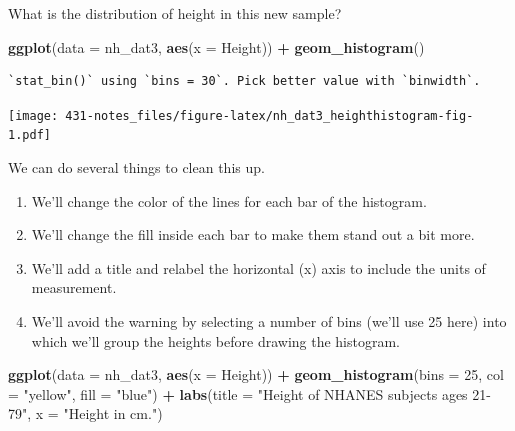 \documentclass[
]{book}
\newenvironment{Shaded}{\begin{snugshade}}{\end{snugshade}}
\newcommand{\DataTypeTok}[1]{\textcolor[rgb]{0.13,0.29,0.53}{#1}}
\newcommand{\DecValTok}[1]{\textcolor[rgb]{0.00,0.00,0.81}{#1}}
\newcommand{\KeywordTok}[1]{\textcolor[rgb]{0.13,0.29,0.53}{\textbf{#1}}}
\newcommand{\NormalTok}[1]{#1}
\newcommand{\OperatorTok}[1]{\textcolor[rgb]{0.81,0.36,0.00}{\textbf{#1}}}
\newcommand{\StringTok}[1]{\textcolor[rgb]{0.31,0.60,0.02}{#1}}
\providecommand{\tightlist}{%
  \setlength{\itemsep}{0pt}\setlength{\parskip}{0pt}}
\begin{document}
What is the distribution of height in this new sample?

\begin{Shaded}
\begin{Highlighting}[]
\KeywordTok{ggplot}\NormalTok{(}\DataTypeTok{data =}\NormalTok{ nh_dat3, }\KeywordTok{aes}\NormalTok{(}\DataTypeTok{x =}\NormalTok{ Height)) }\OperatorTok{+}\StringTok{ }
\StringTok{    }\KeywordTok{geom_histogram}\NormalTok{() }
\end{Highlighting}
\end{Shaded}

\begin{verbatim}
`stat_bin()` using `bins = 30`. Pick better value with `binwidth`.
\end{verbatim}

\texttt{[image: 431-notes\_files/figure-latex/nh\_dat3\_heighthistogram-fig-1.pdf]}

We can do several things to clean this up.

\begin{enumerate}
\def\labelenumi{\arabic{enumi}.}
\tightlist
\item
  We'll change the color of the lines for each bar of the histogram.
\item
  We'll change the fill inside each bar to make them stand out a bit more.
\item
  We'll add a title and relabel the horizontal (x) axis to include the units of measurement.
\item
  We'll avoid the warning by selecting a number of bins (we'll use 25 here) into which we'll group the heights before drawing the histogram.
\end{enumerate}

\begin{Shaded}
\begin{Highlighting}[]
\KeywordTok{ggplot}\NormalTok{(}\DataTypeTok{data =}\NormalTok{ nh_dat3, }\KeywordTok{aes}\NormalTok{(}\DataTypeTok{x =}\NormalTok{ Height)) }\OperatorTok{+}\StringTok{ }
\StringTok{    }\KeywordTok{geom_histogram}\NormalTok{(}\DataTypeTok{bins =} \DecValTok{25}\NormalTok{, }\DataTypeTok{col =} \StringTok{"yellow"}\NormalTok{, }\DataTypeTok{fill =} \StringTok{"blue"}\NormalTok{) }\OperatorTok{+}\StringTok{ }
\StringTok{    }\KeywordTok{labs}\NormalTok{(}\DataTypeTok{title =} \StringTok{"Height of NHANES subjects ages 21-79"}\NormalTok{,}
         \DataTypeTok{x =} \StringTok{"Height in cm."}\NormalTok{)}
\end{Highlighting}
\end{Shaded}
\end{document}
